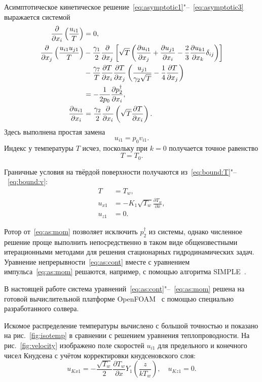 \documentclass[english,russian,a4paper,12pt]{article}
\newcommand{\pder}[2][]{\frac{\partial#1}{\partial#2}}
\begin{document}
Асимптотическое кинетическое решение~\eqref{eq:asymptotic1}"--~\eqref{eq:asymptotic3} выражается системой
\begin{align}
	\pder{x_i}\left(\frac{u_{i1}}T\right) &= 0, \label{eq:as:cont} \\
	\pder{x_j}\left(\frac{u_{i1}u_{j1}}{T}\right)
		&-\frac{\gamma_1}2\pder{x_j}\left[\sqrt{T}\left(
			\pder[u_{i1}]{x_j}+\pder[u_{j1}]{x_i}-\frac23\pder[u_{k1}]{x_k}\delta_{ij}\right
		)\right] \notag\\
		&- \frac{\gamma_7}T\pder[T]{x_i}\pder[T]{x_j}\left(\frac{u_{j1}}{\gamma_2\sqrt{T}} - \frac{1}4\pder[T]{x_j}\right) \notag\\
		&= -\frac1{2p_0}\pder[p_2^\dag]{x_i}, \label{eq:as:mom} \\
	\pder[u_{i1}]{x_i} &= \frac{\gamma_2}2\pder{x_i}\left(\sqrt{T}\pder[T]{x_i}\right). \label{eq:as:temp}
\end{align}
Здесь выполнена простая замена
\[ u_{i1} = p_0v_{i1}. \]
Индекс у температуры \(T\) исчез, поскольку при \(k=0\) получается точное равенство \[T=T_0.\]

Граничные условия на твёрдой поверхности получаются из~\eqref{eq:bound:T}"--~\eqref{eq:bound:v}:
\begin{align*}
	T &= T_w, \\
	u_{x1} &= -K_1\sqrt{T_w}\pder[T_w]{x}, \\
	u_{z1} &= 0.
\end{align*}

Ротор от~\eqref{eq:as:mom} позволяет исключить \(p_2^\dag\) из системы,
однако численное решение проще выполнить непосредственно в таком виде
общеизвестными итерационными методами для решения стационарных гидродинамических задач.
Уравнение непрерывности~\eqref{eq:as:cont} вместе с уравнением импульса~\eqref{eq:as:mom}
решаются, например, с помощью алгоритма SIMPLE~\cite{Caretto1972}.

В настоящей работе система уравнений~\eqref{eq:as:cont}"--~\eqref{eq:as:mom} решена
на готовой вычислительной платформе OpenFOAM\textregistered{}~\cite{Tabor1998}
с помощью специально разработанного солвера.

Искомое распределение температуры вычислено с большой точностью и показано
на рис.~\ref{fig:isotemp} в сравнении с решением уравнения теплопроводности.
На рис.~\ref{fig:velocity} изображено поле скоростей \(u_{i1}\) для предельного
и конечного чисел Кнудсена с учётом корректировки кнудсеновского слоя:
\[ u_{Kx1} = -\frac{\sqrt{T_w}}2\pder[T_w]{x} Y_1\left(\frac{z}{kT_w}\right), \quad u_{Kz1} = 0. \]
\end{document}
